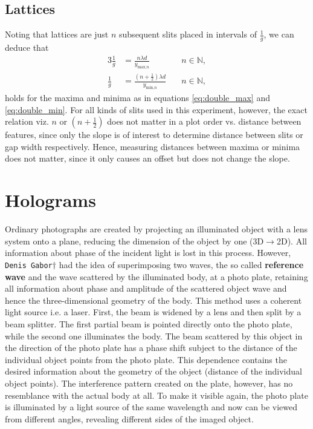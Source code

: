 \subsection{Lattices}\label{subsec:lattices}
Noting that lattices are just $n$ subsequent slits placed in intervals of $\frac{1}{g}$, we can deduce that
\begin{alignat}{3}
 	\frac{1}{g} &= \frac{n\lambda d}{y_{\text{max,}n}} &\quad n\in\mathbb{N},\label{eq:lattice_max} \\
	\frac{1}{g} &= \frac{\left(n+\frac{1}{2}\right)\lambda d}{y_{\text{min,}n}} &\quad n\in\mathbb{N}, \label{eq:lattice_min}
\end{alignat}
holds for the maxima and minima as in equations \ref{eq:double_max} and \ref{eq:double_min}.
For all kinds of slits used in this experiment, however, the exact relation viz. $n$ or $\left(n+\frac{1}{2}\right)$ does not matter in a plot order vs. distance between features, since only the slope is of interest to determine distance between slits or gap width respectively.
Hence, measuring distances between maxima or minima does not matter, since it only causes an offset but does not change the slope.

\section{Holograms}\label{sec:holograms}
Ordinary photographs are created by projecting an illuminated object with a lens system onto a plane, reducing the dimension of the object by one (3D$\rightarrow$2D).
All information about phase of the incident light is lost in this process.
However, \texttt{Denis Gabor}$\dagger$ had the idea of superimposing two waves, the so called \textbf{reference wave} and the wave scattered by the illuminated body, at a photo plate, retaining all information about phase and amplitude of the scattered object wave and hence the three-dimensional geometry of the body.
This method uses a coherent light source i.e. a laser.
First, the beam is widened by a lens and then split by a beam splitter.
The first partial beam is pointed directly onto the photo plate, while the second one illuminates the body.
The beam scattered by this object in the direction of the photo plate has a phase shift subject to the distance of the individual object points from the photo plate.
This dependence contains the desired information about the geometry of the object (distance of the individual object points).
The interference pattern created on the plate, however, has no resemblance with the actual body at all.
To make it visible again, the photo plate is illuminated by a light source of the same wavelength and now can be viewed from different angles, revealing different sides of the imaged object.

